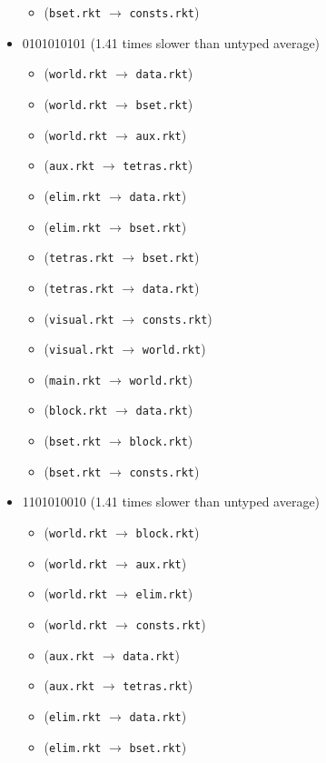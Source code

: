 \documentclass{article}
\newcommand{\mono}[1]{\texttt{#1}}
\begin{document}
\begin{itemize}
\begin{itemize}
  \item (\mono{bset.rkt} $\rightarrow$ \mono{consts.rkt})
  \end{itemize}
\item 0101010101 (1.41 times slower than untyped average)
  \begin{itemize}
  \item (\mono{world.rkt} $\rightarrow$ \mono{data.rkt})
  \item (\mono{world.rkt} $\rightarrow$ \mono{bset.rkt})
  \item (\mono{world.rkt} $\rightarrow$ \mono{aux.rkt})
  \item (\mono{aux.rkt} $\rightarrow$ \mono{tetras.rkt})
  \item (\mono{elim.rkt} $\rightarrow$ \mono{data.rkt})
  \item (\mono{elim.rkt} $\rightarrow$ \mono{bset.rkt})
  \item (\mono{tetras.rkt} $\rightarrow$ \mono{bset.rkt})
  \item (\mono{tetras.rkt} $\rightarrow$ \mono{data.rkt})
  \item (\mono{visual.rkt} $\rightarrow$ \mono{consts.rkt})
  \item (\mono{visual.rkt} $\rightarrow$ \mono{world.rkt})
  \item (\mono{main.rkt} $\rightarrow$ \mono{world.rkt})
  \item (\mono{block.rkt} $\rightarrow$ \mono{data.rkt})
  \item (\mono{bset.rkt} $\rightarrow$ \mono{block.rkt})
  \item (\mono{bset.rkt} $\rightarrow$ \mono{consts.rkt})
  \end{itemize}
\item 1101010010 (1.41 times slower than untyped average)
  \begin{itemize}
  \item (\mono{world.rkt} $\rightarrow$ \mono{block.rkt})
  \item (\mono{world.rkt} $\rightarrow$ \mono{aux.rkt})
  \item (\mono{world.rkt} $\rightarrow$ \mono{elim.rkt})
  \item (\mono{world.rkt} $\rightarrow$ \mono{consts.rkt})
  \item (\mono{aux.rkt} $\rightarrow$ \mono{data.rkt})
  \item (\mono{aux.rkt} $\rightarrow$ \mono{tetras.rkt})
  \item (\mono{elim.rkt} $\rightarrow$ \mono{data.rkt})
  \item (\mono{elim.rkt} $\rightarrow$ \mono{bset.rkt})

\end{itemize}
\end{itemize}
\end{document}
